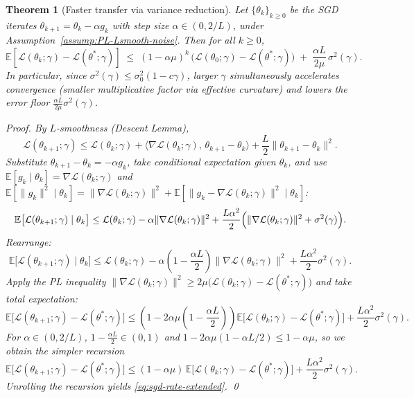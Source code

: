 \documentclass[preprint,12pt]{elsarticle}
\def\textit#1{#1}%
\newtheorem{theorem}{Theorem}[section]
\begin{document}
\begin{theorem}[Faster transfer via variance reduction]
\label{thm:sgd-rate}
Let $\{\theta_k\}_{k\ge0}$ be the SGD iterates $\theta_{k+1}=\theta_k-\alpha g_k$ with step size $\alpha\in(0,2/L)$,
under Assumption~\ref{assump:PL-Lsmooth-noise}.
Then for all $k\ge0$,
\begin{equation}
\mathbb{E}\!\left[\mathcal{L}(\theta_{k};\gamma)-\mathcal{L}(\theta^\ast;\gamma)\right]
\;\le\;
(1-\alpha\mu)^{k}\,\bigl(\mathcal{L}(\theta_{0};\gamma)-\mathcal{L}(\theta^\ast;\gamma)\bigr)
\;+\;
\frac{\alpha L}{2\mu}\,\sigma^2(\gamma).
\label{eq:sgd-rate-extended}
\end{equation}
In particular, since $\sigma^2(\gamma)\le \sigma_0^2(1-c\gamma)$, larger $\gamma$ simultaneously accelerates convergence
(smaller multiplicative factor via effective curvature) and lowers the error floor $\frac{\alpha L}{2\mu}\sigma^2(\gamma)$.

\textit{Proof.}
By $L$-smoothness (Descent Lemma),
\[
\mathcal{L}(\theta_{k+1};\gamma)
\le
\mathcal{L}(\theta_k;\gamma)
+\bigl\langle \nabla \mathcal{L}(\theta_k;\gamma),\, \theta_{k+1}-\theta_k \bigr\rangle
+\frac{L}{2}\|\theta_{k+1}-\theta_k\|^2.
\]
Substitute $\theta_{k+1}-\theta_k=-\alpha g_k$, take conditional expectation given $\theta_k$, and use
$\mathbb{E}[g_k\mid\theta_k]=\nabla \mathcal{L}(\theta_k;\gamma)$ and
$\mathbb{E}[\|g_k\|^2\mid\theta_k]=\|\nabla \mathcal{L}(\theta_k;\gamma)\|^2
+\mathbb{E}[\|g_k-\nabla \mathcal{L}(\theta_k;\gamma)\|^2\mid\theta_k]$:
\[
\mathbb{E}\bigl[\mathcal{L}(\theta_{k+1};\gamma)\mid \theta_k\bigr]
\le
\mathcal{L}(\theta_k;\gamma)
-\alpha \|\nabla \mathcal{L}(\theta_k;\gamma)\|^2
+\frac{L\alpha^2}{2}\Bigl(\|\nabla \mathcal{L}(\theta_k;\gamma)\|^2+\sigma^2(\gamma)\Bigr).
\]
Rearrange:
\[
\mathbb{E}\bigl[\mathcal{L}(\theta_{k+1};\gamma)\mid \theta_k\bigr]
\le
\mathcal{L}(\theta_k;\gamma)
-\alpha\!\left(1-\frac{\alpha L}{2}\right)\!\|\nabla \mathcal{L}(\theta_k;\gamma)\|^2
+\frac{L\alpha^2}{2}\sigma^2(\gamma).
\]
Apply the PL inequality
$\|\nabla \mathcal{L}(\theta_k;\gamma)\|^2 \ge 2\mu\bigl(\mathcal{L}(\theta_k;\gamma)-\mathcal{L}(\theta^\ast;\gamma)\bigr)$
and take total expectation:
\[
\mathbb{E}\bigl[\mathcal{L}(\theta_{k+1};\gamma)-\mathcal{L}(\theta^\ast;\gamma)\bigr]
\le
\left(1-2\alpha\mu\left(1-\frac{\alpha L}{2}\right)\right)
\mathbb{E}\bigl[\mathcal{L}(\theta_k;\gamma)-\mathcal{L}(\theta^\ast;\gamma)\bigr]
+\frac{L\alpha^2}{2}\sigma^2(\gamma).
\]
For $\alpha\in(0,2/L)$, $1-\frac{\alpha L}{2}\in(0,1)$ and
$1-2\alpha\mu(1-\alpha L/2)\le 1-\alpha\mu$,
so we obtain the simpler recursion
\[
\mathbb{E}\bigl[\mathcal{L}(\theta_{k+1};\gamma)-\mathcal{L}(\theta^\ast;\gamma)\bigr]
\le
(1-\alpha\mu)\,
\mathbb{E}\bigl[\mathcal{L}(\theta_k;\gamma)-\mathcal{L}(\theta^\ast;\gamma)\bigr]
+\frac{L\alpha^2}{2}\sigma^2(\gamma).
\]
Unrolling the recursion yields \eqref{eq:sgd-rate-extended}.
\qed
\end{theorem}
\end{document}
